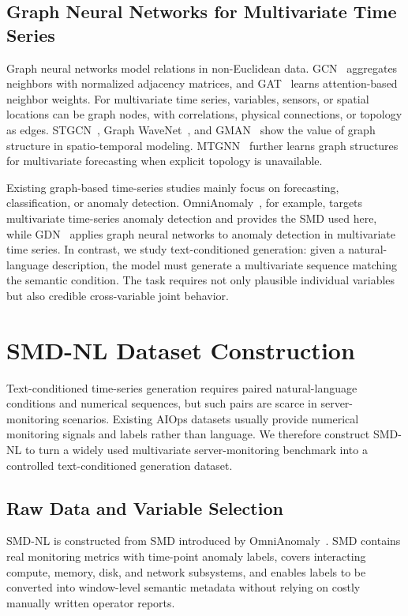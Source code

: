 \documentclass[conference]{IEEEtran}
\begin{document}
\subsection{Graph Neural Networks for Multivariate Time Series}

Graph neural networks model relations in non-Euclidean data. GCN~\cite{kipf2017gcn} aggregates neighbors with normalized adjacency matrices, and GAT~\cite{velickovic2018gat} learns attention-based neighbor weights. For multivariate time series, variables, sensors, or spatial locations can be graph nodes, with correlations, physical connections, or topology as edges. STGCN~\cite{yu2018stgcn}, Graph WaveNet~\cite{wu2019graphwavenet}, and GMAN~\cite{zheng2020gman} show the value of graph structure in spatio-temporal modeling. MTGNN~\cite{wu2020mtgnn} further learns graph structures for multivariate forecasting when explicit topology is unavailable.

Existing graph-based time-series studies mainly focus on forecasting, classification, or anomaly detection. OmniAnomaly~\cite{su2019omnianomaly}, for example, targets multivariate time-series anomaly detection and provides the SMD used here, while GDN~\cite{deng2021gdn} applies graph neural networks to anomaly detection in multivariate time series. In contrast, we study text-conditioned generation: given a natural-language description, the model must generate a multivariate sequence matching the semantic condition. The task requires not only plausible individual variables but also credible cross-variable joint behavior.

\section{SMD-NL Dataset Construction}

Text-conditioned time-series generation requires paired natural-language conditions and numerical sequences, but such pairs are scarce in server-monitoring scenarios. Existing AIOps datasets usually provide numerical monitoring signals and labels rather than language. We therefore construct SMD-NL to turn a widely used multivariate server-monitoring benchmark into a controlled text-conditioned generation dataset.

\subsection{Raw Data and Variable Selection}

SMD-NL is constructed from SMD introduced by OmniAnomaly~\cite{su2019omnianomaly}. SMD contains real monitoring metrics with time-point anomaly labels, covers interacting compute, memory, disk, and network subsystems, and enables labels to be converted into window-level semantic metadata without relying on costly manually written operator reports.
\end{document}
